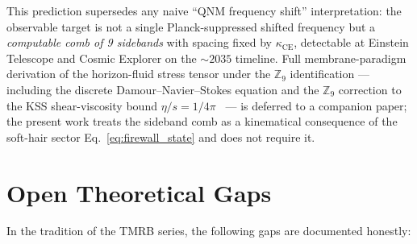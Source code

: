 \documentclass[11pt,a4paper]{article}
\begin{document}
This prediction supersedes any naive ``QNM frequency shift'' interpretation:
the observable target is not a single Planck-suppressed shifted frequency but
a \emph{computable comb of 9 sidebands} with spacing fixed by
$\kappa_{\mathrm{CE}}$, detectable at Einstein Telescope and Cosmic Explorer
on the $\sim 2035$ timeline. Full membrane-paradigm derivation of the
horizon-fluid stress tensor under the $\mathbb{Z}_9$ identification — including
the discrete Damour--Navier--Stokes equation and the $\mathbb{Z}_9$ correction
to the KSS shear-viscosity bound $\eta/s = 1/4\pi$~\cite{KSS2005} — is
deferred to a companion paper; the present work treats the sideband comb as
a kinematical consequence of the soft-hair sector Eq.~\eqref{eq:firewall_state}
and does not require it.

\section{Open Theoretical Gaps}
\label{sec:gaps}

In the tradition of the TMRB series, the following gaps are documented honestly:
\end{document}
